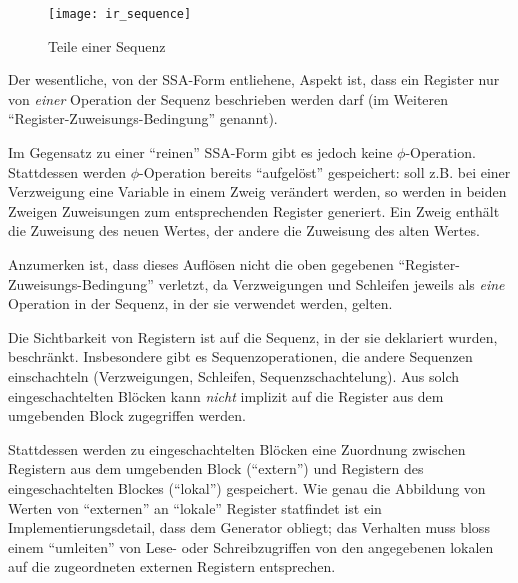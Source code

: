 \documentclass[twoside,a4paper,fleqn,12pt]{article}
\begin{document}
\begin{figure}[h]
   \centering
  \texttt{[image: ir\_sequence]}
  \caption{Teile einer Sequenz}
  \label{fig:ir_sequence}
\end{figure}

Der wesentliche, von der SSA-Form entliehene, Aspekt ist, dass ein Register nur von \emph{einer} Operation der Sequenz beschrieben werden darf
(im Weiteren "`Register-Zuweisungs-Bedingung"' genannt).

Im Gegensatz zu einer "`reinen"' SSA-Form gibt es jedoch keine $\phi$-Operation. Stattdessen werden $\phi$-Operation bereits "`aufgelöst"'
gespeichert: soll z.B. bei einer Verzweigung eine Variable in einem Zweig verändert werden, so werden in beiden Zweigen Zuweisungen zum
entsprechenden Register generiert. Ein Zweig enthält die Zuweisung des neuen Wertes, der andere die Zuweisung des alten Wertes.

Anzumerken ist, dass dieses Auflösen nicht die oben gegebenen "`Register-Zuweisungs-Bedingung"' verletzt, da Verzweigungen und Schleifen
jeweils als \emph{eine} Operation in der Sequenz, in der sie verwendet werden, gelten.

Die Sichtbarkeit von Registern ist auf die Sequenz, in der sie deklariert wurden, beschränkt.
Insbesondere gibt es Sequenzoperationen, die andere Sequenzen einschachteln (Verzweigungen, Schleifen, Sequenzschachtelung).
Aus solch eingeschachtelten Blöcken kann \emph{nicht} implizit auf die Register aus dem umgebenden Block
zugegriffen werden.

Stattdessen werden zu eingeschachtelten Blöcken eine Zuordnung zwischen Registern aus dem umgebenden Block
("`extern"') und
Registern des eingeschachtelten Blockes ("`lokal"') gespeichert.
Wie genau die Abbildung von Werten von "`externen"' an "`lokale"' Register statfindet ist ein Implementierungsdetail, dass dem Generator obliegt;
das Verhalten muss bloss einem "`umleiten"' von Lese- oder Schreibzugriffen von den angegebenen lokalen auf die zugeordneten externen
Registern entsprechen.
\end{document}
